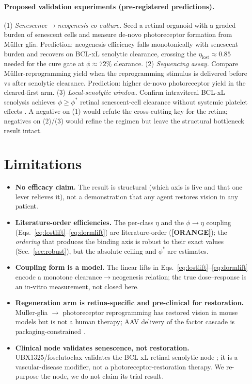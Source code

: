 \documentclass[11pt,a4paper]{article}
\newcommand{\tierbadge}[2]{\textcolor{#1}{\textbf{[#2]}}}
\providecommand{\tierOrange}{\tierbadge{orange!80!black}{ORANGE}}
\begin{document}
\paragraph{Proposed validation experiments (pre-registered predictions).}
(1) \emph{Senescence$\to$neogenesis co-culture.} Seed a retinal organoid with a graded burden of
senescent cells and measure de-novo photoreceptor formation from M\"uller glia. Prediction:
neogenesis efficiency falls monotonically with senescent burden and recovers on BCL-xL senolytic
clearance, crossing the $\eta_{\text{lost}}\!\approx\!0.85$ needed for the cure gate at
$\phi\!\approx\!72\%$ clearance. (2) \emph{Sequencing assay.} Compare M\"uller-reprogramming yield
when the reprogramming stimulus is delivered before vs after senolytic clearance. Prediction:
higher de-novo photoreceptor yield in the cleared-first arm. (3) \emph{Local-senolytic window.}
Confirm intravitreal BCL-xL senolysis achieves $\phi\geq\phi^\ast$ retinal senescent-cell
clearance without systemic platelet effects \citep{he2020,crespodawid2024}. A negative on (1) would
refute the cross-cutting key for the retina; negatives on (2)/(3) would refine the regimen but
leave the structural bottleneck result intact.

\section{Limitations}
\label{sec:limits}
\begin{itemize}\itemsep0.2em
\item \textbf{No efficacy claim.} The result is structural (which axis is live and that one lever
relieves it), not a demonstration that any agent restores vision in any patient.
\item \textbf{Literature-order efficiencies.} The per-class $\eta$ and the $\phi\to\eta$ coupling
(Eqs.~\eqref{eq:lostlift}--\eqref{eq:dormlift}) are literature-order (\tierOrange); the
\emph{ordering} that produces the binding axis is robust to their exact values
(Sec.~\ref{sec:robust}), but the absolute ceiling and $\phi^\ast$ are estimates.
\item \textbf{Coupling form is a model.} The linear lifts in Eqs.~\eqref{eq:lostlift}--\eqref{eq:dormlift}
encode a monotone clearance$\to$neogenesis relation; the true dose--response is an in-vitro
measurement, not closed here.
\item \textbf{Regeneration arm is retina-specific and pre-clinical for restoration.} M\"uller-glia
$\to$ photoreceptor reprogramming has restored vision in mouse models \citep{yao2018} but is not a
human therapy; AAV delivery of the factor cascade is packaging-constrained \citep{wu2010}.
\item \textbf{Clinical node validates senescence, not restoration.} UBX1325/foselutoclax validates
the BCL-xL retinal senolytic node \citep{crespodawid2024}; it is a vascular-disease modifier, not a
photoreceptor-restoration therapy. We re-purpose the node, we do not claim its trial result.
\end{itemize}
\end{document}
